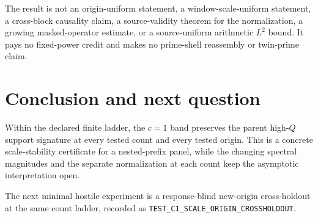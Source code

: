 \documentclass[10pt]{article}
\begin{document}
The result is not an origin-uniform statement, a window-scale-uniform
statement, a cross-block causality claim, a source-validity theorem for the
normalization, a growing masked-operator estimate, or a source-uniform
arithmetic $L^2$ bound. It pays no fixed-power credit and makes no
prime-shell reassembly or twin-prime claim.

\section{Conclusion and next question}

Within the declared finite ladder, the $c=1$ band preserves the parent
high-$Q$ support signature at every tested count and every tested origin.
This is a concrete scale-stability certificate for a nested-prefix panel,
while the changing spectral magnitudes and the separate normalization at
each count keep the asymptotic interpretation open.

The next minimal hostile experiment is a response-blind new-origin
cross-holdout at the same count ladder, recorded as
\texttt{TEST\_C1\_SCALE\_ORIGIN\_CROSSHOLDOUT}.
\end{document}

